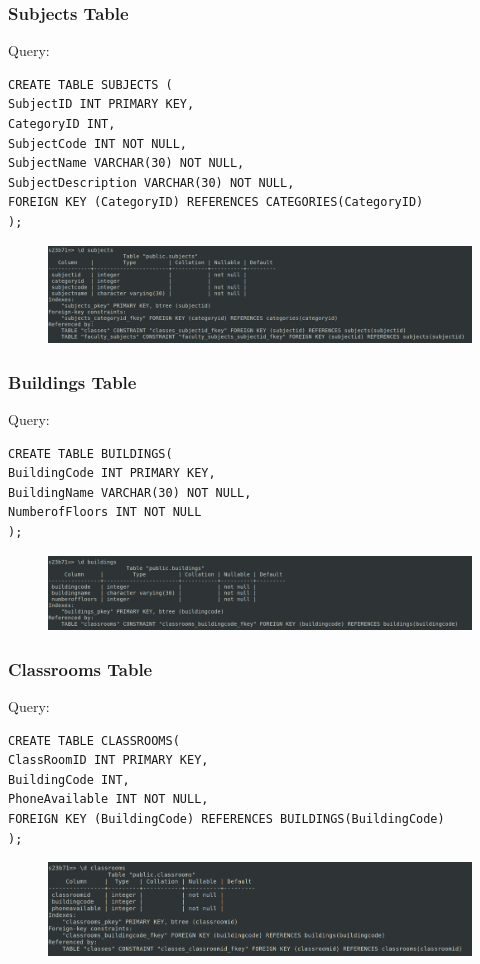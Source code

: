 \documentclass{article}
\begin{document}
\subsubsection*{Subjects Table}
Query:
\begin{Verbatim}[frame=single,framerule=1pt,fontfamily=courier,fontsize=\small]
CREATE TABLE SUBJECTS (
SubjectID INT PRIMARY KEY,
CategoryID INT,
SubjectCode INT NOT NULL,
SubjectName VARCHAR(30) NOT NULL,
SubjectDescription VARCHAR(30) NOT NULL,
FOREIGN KEY (CategoryID) REFERENCES CATEGORIES(CategoryID)
);
\end{Verbatim}
\begin{figure}[H]
    \centering
    \includegraphics[width=\textwidth]{schema/subjects.png}
\end{figure}

\subsubsection*{Buildings Table}
Query:
\begin{Verbatim}[frame=single,framerule=1pt,fontfamily=courier,fontsize=\small]
CREATE TABLE BUILDINGS(
BuildingCode INT PRIMARY KEY,
BuildingName VARCHAR(30) NOT NULL,
NumberofFloors INT NOT NULL
);
\end{Verbatim}
\begin{figure}[H]
    \centering
    \includegraphics[width=\textwidth]{schema/buildings.png}
\end{figure}

\subsubsection*{Classrooms Table}
Query:
\begin{Verbatim}[frame=single,framerule=1pt,fontfamily=courier,fontsize=\small]
CREATE TABLE CLASSROOMS(
ClassRoomID INT PRIMARY KEY,
BuildingCode INT,
PhoneAvailable INT NOT NULL,
FOREIGN KEY (BuildingCode) REFERENCES BUILDINGS(BuildingCode)
);
\end{Verbatim}
\begin{figure}[H]
    \centering
    \includegraphics[width=\textwidth]{schema/classrooms.png}
\end{figure}
\end{document}
